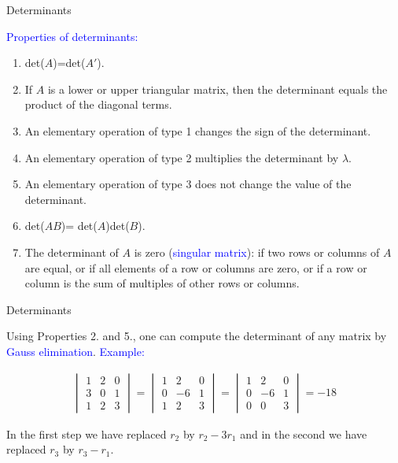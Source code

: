 \documentclass[11pt,aspectratio=169]{beamer}
\begin{document}
\begin{frame}{Determinants}

\textcolor{blue}{Properties of determinants:}
\begin{enumerate}
\item det($A$)=det($A'$).

\item If $A$ is a lower or upper triangular matrix, then the determinant equals the product of the diagonal terms.


\item An elementary operation of type 1 changes the sign of the determinant.

\item An elementary operation of type 2 multiplies the determinant by $\lambda$.

\item An elementary operation of type 3 does not change the value of the determinant.



\item  det($AB$)= det($A$)det($B$).

\item The determinant of $A$ is zero (\textcolor{blue}{singular matrix}): if two rows or columns of $A$ are equal, or if all elements of a row or columns are zero, or if a row or column is the sum of multiples of other rows or columns.

\end{enumerate}\end{frame}


\begin{frame}{Determinants}

Using Properties 2. and 5., one can compute the  determinant of any matrix by  \textcolor{blue}{Gauss elimination}.
\vskip 12pt
\textcolor{blue}{Example:} 

\begin{equation*} \begin{split}
 \begin{vmatrix}
1 & 2 & 0\\
3 & 0 & 1 \\
1 & 2 & 3
\end{vmatrix}=\begin{vmatrix}
1 & 2 & 0\\
0 & -6 & 1 \\
1 & 2 & 3
\end{vmatrix}=\begin{vmatrix}
1 & 2 & 0\\
0 & -6 & 1 \\0 & 0 & 3
\end{vmatrix}=-18
\end{split}
\end{equation*}

\begin{tiny}In the first step we have replaced $r_2$ by $r_2-3r_1$ and in the second we have replaced $r_3$ by $r_3-r_1$.\end{tiny}
\end{frame}
\end{document}

